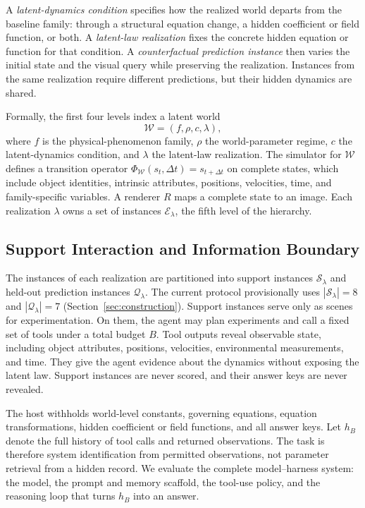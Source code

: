 A \emph{latent-dynamics condition} specifies how the realized world departs from the baseline family: through a structural equation change, a hidden coefficient or field function, or both. A \emph{latent-law realization} fixes the concrete hidden equation or function for that condition. A \emph{counterfactual prediction instance} then varies the initial state and the visual query while preserving the realization. Instances from the same realization require different predictions, but their hidden dynamics are shared.

Formally, the first four levels index a latent world
\begin{equation}
  \mathcal{W} = (f, \rho, c, \lambda),
  \label{eq:latent-world}
\end{equation}
where $f$ is the physical-phenomenon family, $\rho$ the world-parameter regime, $c$ the latent-dynamics condition, and $\lambda$ the latent-law realization. The simulator for $\mathcal{W}$ defines a transition operator $\Phi_{\mathcal{W}}(s_t,\Delta t)=s_{t+\Delta t}$ on complete states, which include object identities, intrinsic attributes, positions, velocities, time, and family-specific variables. A renderer $R$ maps a complete state to an image. Each realization $\lambda$ owns a set of instances $\mathcal{E}_\lambda$, the fifth level of the hierarchy.

\subsection{Support Interaction and Information Boundary}

The instances of each realization are partitioned into support instances $\mathcal{S}_\lambda$ and held-out prediction instances $\mathcal{Q}_\lambda$. The current protocol provisionally uses $|\mathcal{S}_\lambda|=8$ and $|\mathcal{Q}_\lambda|=7$ (Section~\ref{sec:construction}). Support instances serve only as scenes for experimentation. On them, the agent may plan experiments and call a fixed set of tools under a total budget $B$. Tool outputs reveal observable state, including object attributes, positions, velocities, environmental measurements, and time. They give the agent evidence about the dynamics without exposing the latent law. Support instances are never scored, and their answer keys are never revealed.

The host withholds world-level constants, governing equations, equation transformations, hidden coefficient or field functions, and all answer keys. Let $h_B$ denote the full history of tool calls and returned observations. The task is therefore system identification from permitted observations, not parameter retrieval from a hidden record. We evaluate the complete model--harness system: the model, the prompt and memory scaffold, the tool-use policy, and the reasoning loop that turns $h_B$ into an answer.

